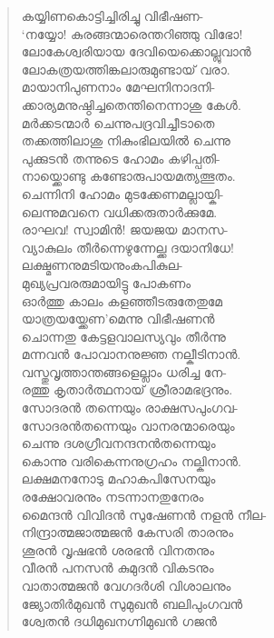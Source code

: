 \begin{verse}
കയ്യിണകൊട്ടിച്ചിരിച്ചു വിഭീഷണ-\\
‘നയ്യോ! കുരങ്ങന്മാരെന്തറിഞ്ഞു വിഭോ!\\
ലോകേശ്വരിയായ ദേവിയെക്കൊല്ലുവാന്‍\\
ലോകത്രയത്തിങ്കലാരുമുണ്ടായ് വരാ.\\
മായാനിപുണനാം മേഘനിനാദനി-\\
ക്കാര്യമനുഷ്ഠിച്ചതെന്തിനെന്നാശു കേള്‍.\\
മര്‍ക്കടന്മാര്‍ ചെന്നുപദ്രവിച്ചീടാതെ\\
തക്കത്തിലാശു നികുംഭിലയില്‍ ചെന്നു\\
പുക്കുടന്‍ തന്നുടെ ഹോമം കഴിപ്പതി-\\
നായ്ക്കൊണ്ടു കണ്ടോരുപായമത്യത്ഭുതം.\\
ചെന്നിനി ഹോമം മുടക്കേണമല്ലായ്കി-\\
ലെന്നുമവനെ വധിക്കരുതാര്‍ക്കുമേ.\\
രാഘവ! സ്വാമിന്‍! ജയജയ മാനസ-\\
വ്യാകുലം തീര്‍ന്നെഴുന്നേല്ക്ക ദയാനിധേ!\\
ലക്ഷ്മണനുമടിയനുംകപികുല-\\
മുഖ്യപ്രവരരുമായിട്ടു പോകണം\\
ഓര്‍ത്തു കാലം കളഞ്ഞീടരുതേതുമേ\\
യാത്രയയ്ക്കേണ’മെന്നു വിഭീഷണന്‍\\
ചൊന്നതു കേട്ടളവാലസ്യവും തീര്‍ന്നു\\
മന്നവന്‍ പോവാനനുജ്ഞ നല്കീടിനാന്‍.\\
വസ്തുവൃത്താന്തങ്ങളെല്ലാം ധരിച്ച നേ-\\
രത്തു കൃതാര്‍ത്ഥനായ് ശ്രീരാമഭദ്രനും.\\
സോദരന്‍ തന്നെയും രാക്ഷസപുംഗവ-\\
സോദരന്‍തന്നെയും വാനരന്മാരെയും\\
ചെന്നു ദശഗ്രീവനന്ദനന്‍തന്നെയും\\
കൊന്നു വരികെന്നനുഗ്രഹം നല്കിനാന്‍.\\
ലക്ഷമനനോടു മഹാകപിസേനയും\\
രക്ഷോവരനും നടന്നാനതുനേരം\\
മൈന്ദന്‍ വിവിദന്‍ സുഷേണന്‍ നളന്‍ നീല-\\
നിന്ദ്രാത്മജാത്മജന്‍ കേസരി താരനും\\
ശൂരന്‍ വൃഷഭന്‍ ശരഭന്‍ വിനതനും\\
വീരന്‍ പനസന്‍ കുമുദന്‍ വികടനും\\
വാതാത്മജന്‍ വേഗദര്‍ശി വിശാലനും\\
ജ്യോതിര്‍മുഖന്‍ സുമുഖന്‍ ബലിപുംഗവന്‍\\
ശ്വേതന്‍ ദധിമുഖനഗ്നിമുഖന്‍ ഗജന്‍\\

\end{verse}
